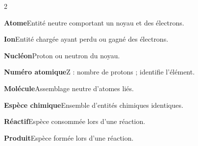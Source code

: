 \begingroup\fontsize{10.5}{13.5}\selectfont\begin{multicols}{2}
\par\addvspace{2mm}\noindent\begin{minipage}{\linewidth}\textbf{Atome}\enspace Entité neutre comportant un noyau et des électrons.\par\end{minipage}\par
\par\addvspace{2mm}\noindent\begin{minipage}{\linewidth}\textbf{Ion}\enspace Entité chargée ayant perdu ou gagné des électrons.\par\end{minipage}\par
\par\addvspace{2mm}\noindent\begin{minipage}{\linewidth}\textbf{Nucléon}\enspace Proton ou neutron du noyau.\par\end{minipage}\par
\par\addvspace{2mm}\noindent\begin{minipage}{\linewidth}\textbf{Numéro atomique}\enspace Z : nombre de protons ; identifie l’élément.\par\end{minipage}\par
\par\addvspace{2mm}\noindent\begin{minipage}{\linewidth}\textbf{Molécule}\enspace Assemblage neutre d’atomes liés.\par\end{minipage}\par
\par\addvspace{2mm}\noindent\begin{minipage}{\linewidth}\textbf{Espèce chimique}\enspace Ensemble d’entités chimiques identiques.\par\end{minipage}\par
\par\addvspace{2mm}\noindent\begin{minipage}{\linewidth}\textbf{Réactif}\enspace Espèce consommée lors d’une réaction.\par\end{minipage}\par
\par\addvspace{2mm}\noindent\begin{minipage}{\linewidth}\textbf{Produit}\enspace Espèce formée lors d’une réaction.\par\end{minipage}\par

\end{multicols}
